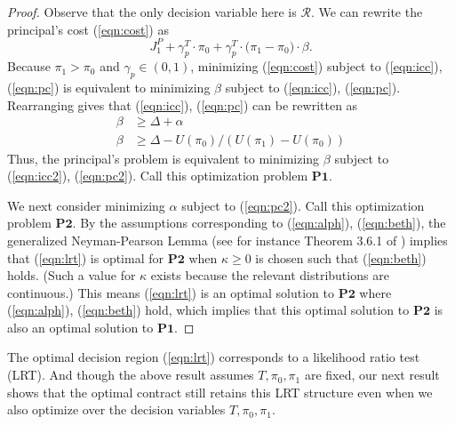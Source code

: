 \documentclass[letterpaper, 10 pt, conference]{ieeeconf}  %
\begin{document}
\begin{proof}
Observe that the only decision variable here is $\mathcal{R}$. We can rewrite the principal's cost (\ref{eqn:cost}) as
\begin{equation}
    J_1^P + \gamma_p^T \cdot \pi_0 + \gamma_p^T\cdot\big(\pi_1 -\pi_0\big)\cdot\beta. \label{eqn:cost2}
\end{equation}
Because $\pi_1 > \pi_0$ and $\gamma_p \in (0,1)$, minimizing (\ref{eqn:cost}) subject to (\ref{eqn:icc}), (\ref{eqn:pc}) is equivalent to minimizing $\beta$ subject to (\ref{eqn:icc}), (\ref{eqn:pc}). Rearranging gives that (\ref{eqn:icc}), (\ref{eqn:pc}) can be rewritten as
\begin{align}
    \beta &\geq \Delta + \alpha \label{eqn:icc2}\\
    \beta &\geq \Delta - U(\pi_0)/(U(\pi_1)-U(\pi_0)) \label{eqn:pc2}
\end{align}
Thus, the principal's problem is equivalent to minimizing $\beta$ subject to (\ref{eqn:icc2}), (\ref{eqn:pc2}). Call this optimization problem $\mathbf{P1}$.

We next consider minimizing $\alpha$ subject to (\ref{eqn:pc2}). Call this optimization problem $\mathbf{P2}$. By the assumptions corresponding to (\ref{eqn:alph}), (\ref{eqn:beth}), the generalized Neyman-Pearson Lemma (see for instance Theorem 3.6.1 of \cite{lehmann2022testing}) implies that (\ref{eqn:lrt}) is optimal for $\mathbf{P2}$ when $\kappa \geq 0$ is chosen such that (\ref{eqn:beth}) holds. (Such a value for $\kappa$ exists because the relevant distributions are continuous.) This means (\ref{eqn:lrt}) is an optimal solution to $\mathbf{P2}$ where (\ref{eqn:alph}), (\ref{eqn:beth}) hold, which implies that this optimal solution to $\mathbf{P2}$ is also an optimal solution to $\mathbf{P1}$.
\end{proof}

The optimal decision region (\ref{eqn:lrt}) corresponds to a likelihood ratio test (LRT). And though the above result assumes $T,\pi_0,\pi_1$ are fixed, our next result shows that the optimal contract still retains this LRT structure even when we also optimize over the decision variables $T,\pi_0,\pi_1$.
\end{document}
